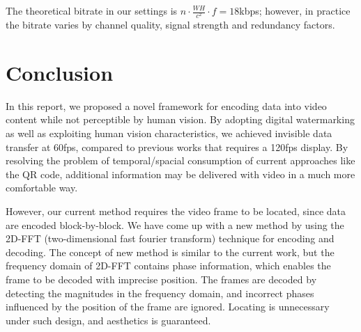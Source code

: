 \documentclass{acm_proc_article-sp}
\begin{document}
The theoretical bitrate in our settings is $n \cdot \frac{WH}{c^2} \cdot f = 18$kbps; however, in practice the bitrate varies by channel quality, signal strength and redundancy factors.

\section{Conclusion}
In this report, we proposed a novel framework for encoding data into video content while not perceptible by human vision. By adopting digital watermarking as well as exploiting human vision characteristics, we achieved invisible data transfer at 60fps, compared to previous works that requires a 120fps display. By resolving the problem of temporal/spacial consumption of current approaches like the QR code, additional information may be delivered with video in a much more comfortable way.

However, our current method requires the video frame to be located, since data are encoded block-by-block. We have come up with a new method by using the 2D-FFT (two-dimensional fast fourier transform) technique for encoding and decoding. The concept of new method is similar to the current work, but the frequency domain of 2D-FFT contains phase information, which enables the frame to be decoded with imprecise position. The frames are decoded by detecting the magnitudes in the frequency domain, and incorrect phases influenced by the position of the frame are ignored. Locating is unnecessary under such design, and aesthetics is guaranteed.



\end{document}
